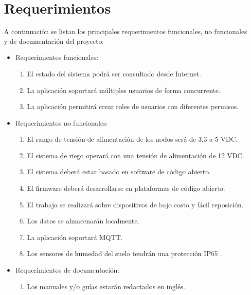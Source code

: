 \section{Requerimientos}
\label{sec:Requerimientos}

A continuación se listan los principales requerimientos funcionales,  no funcionales y de documentación del proyecto:

\begin{itemize}
\item Requerimientos funcionales:
\begin{enumerate}

\item El estado del sistema podrá ser consultado desde Internet.
\item La aplicación soportará múltiples usuarios de forma concurrente.
\item La aplicación permitirá crear roles de usuarios con diferentes permisos.
\end{enumerate}
\end{itemize} 
\begin{itemize}
\item Requerimientos no funcionales:
\begin{enumerate}
\item El rango de tensión de alimentación de los nodos será de 3,3 a 5 VDC.
\item El sistema de riego operará con una tensión de alimentación de 12 VDC.
\item El sistema deberá estar basado en software de código abierto.
\item El firmware deberá desarrollarse en plataformas de código abierto.
\item El trabajo se realizará sobre dispositivos de bajo costo y fácil reposición.
\item Los datos se almacenarán localmente.
\item La aplicación soportará MQTT.
\item Los sensores de humedad del suelo tendrán una protección IP65 \citep{ip65}. 
\end{enumerate}


\end{itemize} 
\begin{itemize}
\item Requerimientos de documentación:
\begin{enumerate}
\item Los manuales y/o guías estarán redactados en inglés.
\end{enumerate}


\end{itemize}
